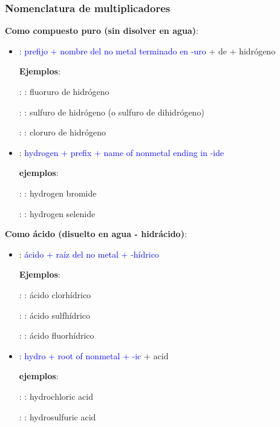 \subsubsection{Nomenclatura de multiplicadores}

\textbf{Como compuesto puro (sin disolver en agua)}:

\begin{itemize}
    \item \noindent{}: \textcolor{blue}{prefijo + nombre del no metal terminado en -uro} + de + hidrógeno

    \textbf{Ejemplos}:

    : : fluoruro de hidrógeno

    : : sulfuro de hidrógeno (o sulfuro de dihidrógeno)

    : : cloruro de hidrógeno


    \item \noindent{}: \textcolor{blue}{hydrogen + prefix + name of nonmetal ending in -ide}

    \textbf{ejemplos}:

    : : hydrogen bromide

    : : hydrogen selenide
\end{itemize}

\textbf{Como ácido (disuelto en agua - hidrácido)}:

\begin{itemize}
    \item \noindent{}: \textcolor{blue}{ácido + raíz del no metal + -hídrico}

    \textbf{Ejemplos}:

    : : ácido clorhídrico

    : : ácido sulfhídrico

    : : ácido fluorhídrico


    \item \noindent{}: \textcolor{blue}{hydro + root of nonmetal + -ic} + acid

    \textbf{ejemplos}:

    : : hydrochloric acid

    : : hydrosulfuric acid
\end{itemize}

